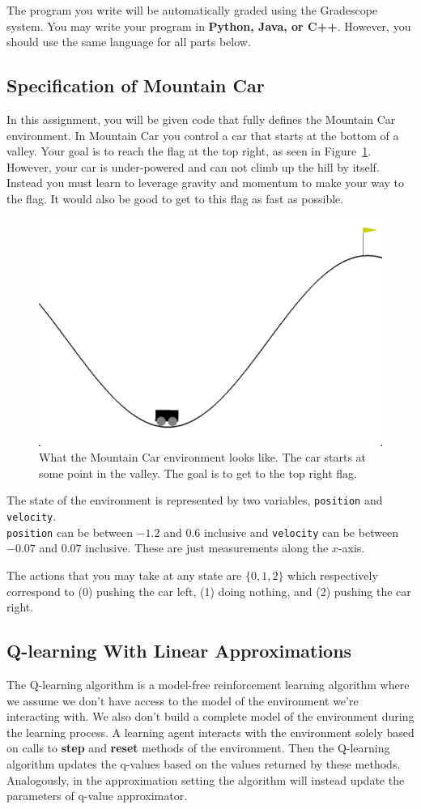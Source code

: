 \documentclass[11pt,addpoints,answers]{exam}
\begin{document}
The program you write will be automatically graded using the Gradescope system. You may write your program in \textbf{Python, Java, or C++}. However, you should use the same language for all parts below.

\subsection{Specification of Mountain Car}
In this assignment, you will be given code that fully defines the Mountain Car environment. In Mountain Car you control a car that starts at the bottom of a valley. Your goal is to reach the flag at the top right, as seen in Figure~\ref{fig:mountaincar}. However, your car is under-powered and can not climb up the hill by itself. Instead you must learn to leverage gravity and momentum to make your way to the flag. It would also be good to get to this flag as fast as possible.

\begin{figure}[H]
    \centering
    \includegraphics[width=0.5\linewidth]{figs/MountainCar.png}
    \caption{What the Mountain Car environment looks like. The car starts at some point in the valley. The goal is to get to the top right flag.}
    \label{fig:mountaincar}
\end{figure}

The state of the environment is represented by two variables, \texttt{position} and \texttt{velocity}.\\\texttt{position} can be between $-1.2$ and $0.6$ inclusive and \texttt{velocity} can be between $-0.07$ and $0.07$ inclusive. These are just measurements along the $x$-axis.

The actions that you may take at any state are $\{0, 1, 2\}$ which respectively correspond to (0) pushing the car left, (1) doing nothing, and (2) pushing the car right.

\subsection{Q-learning With Linear Approximations}
The Q-learning algorithm is a model-free reinforcement learning algorithm where we assume we don't have access to the model of the environment we're interacting with. We also don't build a complete model of the environment during the learning process. A learning agent interacts with the environment solely based on calls to \textbf{step} and \textbf{reset} methods of the environment. Then the Q-learning algorithm updates the q-values based on the values returned by these methods. Analogously, in the approximation setting the algorithm will instead update the parameters of q-value approximator.
\end{document}

